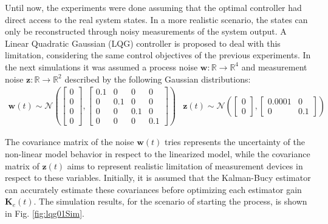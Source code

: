 \documentclass[a4paper,11pt]{book}
\numberwithin{figure}{chapter}
\numberwithin{equation}{chapter}
\numberwithin{table}{chapter}
\theoremstyle{definition}
\begin{document}
Until now, the experiments were done assuming that the optimal controller had direct access to the real system states. In a more realistic scenario, the states can only be reconstructed through noisy measurements of the system output. A Linear Quadratic Gaussian (LQG) controller is proposed to deal with this limitation, considering the same control objectives of the previous experiments. In the next simulations it was assumed a process noise $\bm{w} : \mathbb{R} \rightarrow \mathbb{R}^{4}$ and measurement noise $\bm{z} : \mathbb{R} \rightarrow \mathbb{R}^{2}$ described by the following Gaussian distributions:
\begin{equation}
\begin{matrix}
	\bm{w}(t) \sim \mathcal{N}\left( \begin{bmatrix} 0 \\ 0 \\ 0 \\ 0 \end{bmatrix}, \begin{bmatrix} 0.1 & 0 & 0 & 0 \\ 0 & 0.1 & 0 & 0 \\ 0 & 0 & 0.1 & 0 \\ 0 & 0 & 0 & 0.1 \end{bmatrix} \right) & 
\bm{z}(t) \sim \mathcal{N}\left( \begin{bmatrix} 0 \\ 0 \end{bmatrix}, \begin{bmatrix} 0.0001 & 0 \\ 0 & 0.1 \end{bmatrix} \right)
\end{matrix}
\end{equation}

The covariance matrix of the noise $\bm{w}(t)$ tries represents the uncertainty of the non-linear model behavior in respect to the linearized model, while the covariance matrix of $\bm{z}(t)$ aims to represent realistic limitation of measurement devices in respect to these variables. Initially, it is assumed that the Kalman-Bucy estimator can accurately estimate these covariances before optimizing each estimator gain $\bm{K}_e(t)$. The simulation results, for the scenario of starting the process, is shown in Fig. \ref{fig:lqg01Sim}.
 
\end{document}
